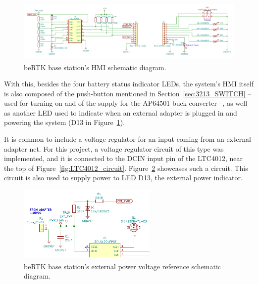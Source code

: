 \begin{figure}[h]
	\centering
	\includegraphics[width=1.0\textwidth]{Chapters/Figures/chapter3/Back_Panel.pdf}
	\caption{beRTK\textsuperscript{\textregistered} base station's HMI schematic diagram.}
	\label{fig:HMI_circuit}
\end{figure}

With this, besides the four battery status indicator LEDs, the system's HMI itself is also composed of the push-button mentioned in Section~\ref{sec:3213_SWITCH} -- used for turning on and of the supply for the AP64501 buck converter --, as well as another LED used to indicate when an external adapter is plugged in and powering the system (D13 in Figure~\ref{fig:HMI_circuit}).

It is common to include a voltage regulator for an input coming from an external adapter net. For this project, a voltage regulator circuit of this type was implemented, and it is connected to the DCIN input pin of the LTC4012, near the top of Figure~\ref{fig:LTC4012_circuit}. Figure~\ref{fig:EXT_PWR} showcases such a circuit. This circuit is also used to supply power to LED D13, the external power indicator.

\begin{figure}[h]
	\centering
	\includegraphics[width=0.6\textwidth]{Chapters/Figures/chapter3/EXT_PWR.pdf}
	\caption{beRTK\textsuperscript{\textregistered} base station's external power voltage reference schematic diagram.}
	\label{fig:EXT_PWR}
\end{figure}

